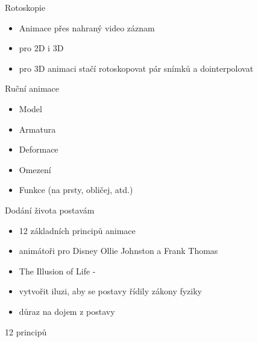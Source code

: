 \documentclass[14pt]{beamer}
\begin{document}
\begin{frame}{Rotoskopie}
\begin{itemize}[label=-]
	\item Animace přes nahraný video záznam
	\item pro 2D i 3D
	\item pro 3D animaci stačí rotoskopovat pár snímků a dointerpolovat
\end{itemize}
\end{frame}

\begin{frame}{Ruční animace}
\begin{itemize}[label=-]
	\item Model
	\item Armatura
	\item Deformace
	\item Omezení
	\item Funkce (na prsty, obličej, atd.)
\end{itemize}
\end{frame}

\begin{frame}{Dodání života postavám}
\begin{itemize}[label=-]
	\item 12 základních principů animace
	\item animátoři pro Disney Ollie Johnston a Frank Thomas 
	\item The Illusion of Life - 
	\item vytvořit iluzi, aby se postavy řídily zákony fyziky
	\item důraz na dojem z postavy
\end{itemize}
\end{frame}

\begin{frame}{12 principů}
\end{frame}
\end{document}
